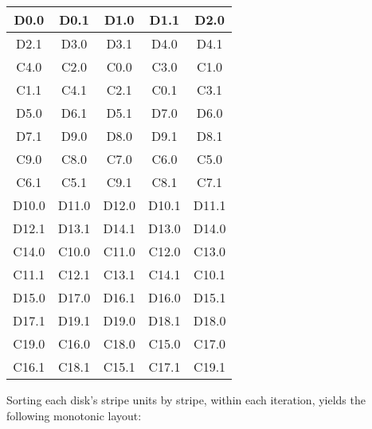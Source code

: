 \documentclass[onecolumn,draft]{IEEEtran}
\begin{document}
\begin{center}
\begin{tabular}{ |c|c|c|c|c| }
  \hline
  D0.0 & D0.1 & D1.0 & D1.1 & D2.0 \\
  \hline
  D2.1 & D3.0 & D3.1 & D4.0 & D4.1 \\
  \hline
  \rowcolor{lightgray} C4.0 & C2.0 & C0.0 & C3.0 & C1.0 \\
  \hline
  \rowcolor{lightgray}C1.1 & C4.1 & C2.1 & C0.1 & C3.1 \\
  \hline
  D5.0 & D6.1 & D5.1 & D7.0 & D6.0 \\
  \hline
  D7.1 & D9.0 & D8.0 & D9.1 & D8.1 \\
  \hline
  \rowcolor{lightgray}C9.0 & C8.0 & C7.0 & C6.0 & C5.0 \\
  \hline
  \rowcolor{lightgray}C6.1 & C5.1 & C9.1 & C8.1 & C7.1 \\
  \hline
  D10.0 & D11.0 & D12.0 & D10.1 & D11.1 \\
  \hline
  D12.1 & D13.1 & D14.1 & D13.0 & D14.0 \\
  \hline
  \rowcolor{lightgray}C14.0 & C10.0 & C11.0 & C12.0 & C13.0 \\
  \hline
  \rowcolor{lightgray}C11.1 & C12.1 & C13.1 & C14.1 & C10.1 \\
  \hline
  D15.0 & D17.0 & D16.1 & D16.0 & D15.1 \\
  \hline
  D17.1 & D19.1 & D19.0 & D18.1 & D18.0 \\
  \hline
  \rowcolor{lightgray}C19.0 & C16.0 & C18.0 & C15.0 & C17.0 \\
  \hline
  \rowcolor{lightgray}C16.1 & C18.1 & C15.1 & C17.1 & C19.1 \\
  \hline
\end{tabular}
\end{center}

Sorting each disk's stripe units by stripe, within each iteration, yields the
following monotonic layout:
\end{document}

